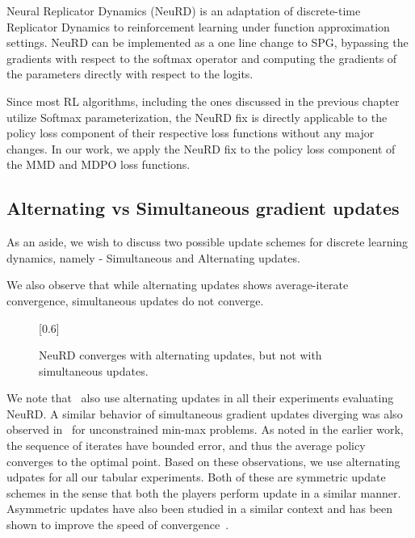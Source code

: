 Neural Replicator Dynamics (NeuRD) is an adaptation of discrete-time Replicator Dynamics to
reinforcement learning under function approximation settings.
NeuRD can be implemented as a one line change to SPG, bypassing the gradients with respect to the
softmax operator and computing the gradients of the parameters directly with respect to the logits.

Since most RL algorithms, including the ones discussed in the previous chapter utilize Softmax
parameterization, the NeuRD fix is directly applicable to the policy loss component of their
respective loss functions without any major changes.
In our work, we apply the NeuRD fix to the policy loss component of the MMD and MDPO loss
functions.

\subsection{Alternating vs Simultaneous gradient updates}
As an aside, we wish to discuss two possible update schemes for discrete learning dynamics, namely
- Simultaneous and Alternating updates.

We also observe that while alternating updates shows average-iterate convergence, simultaneous
updates do not converge.
\begin{figure}[H]
	\centering
	\scalebox{0.6}[0.6]{}
	\caption[Simultaneous gradient updates vs Alternate gradient updates updates]{NeuRD converges with alternating updates, but not with simultaneous updates.}
\end{figure}
We note that~\cite{hennesNeural2020} also use alternating updates in all their experiments
evaluating NeuRD.
A similar behavior of simultaneous gradient updates diverging was also observed
in~\cite{gidelVariational2020} for unconstrained min-max problems.
As noted in the earlier work, the sequence of iterates have bounded error, and thus the average
policy converges to the optimal point.
Based on these observations, we use alternating udpates for all our tabular experiments.
Both of these are symmetric update schemes in the sense that both the players perform update in a
similar manner.
Asymmetric updates have also been studied in a similar context and has been shown to improve the
speed of convergence~\cite{daskalakisTraining2018}.


